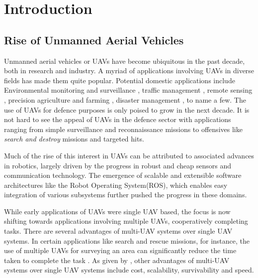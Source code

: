 
\chapter{Introduction} %

\label{Chapter1} %



\section{Rise of Unmanned Aerial Vehicles}
Unmanned aerial vehicles or UAVs have become ubiquitous in the past decade, both in research and industry. A myriad of applications involving UAVs in diverse fields has made them quite popular. Potential domestic  applications include Environmental monitoring and surveillance \cite{envmon}, traffic management \cite{trasur}, remote sensing \cite{remsen}, precision agriculture and farming \cite{preagr}, disaster management \cite{disman}, to name a few. The use of UAVs for defence purposes is only poised to grow in the next decade. It is not hard to see the appeal of UAVs in the defence sector with applications ranging from simple surveillance and reconnaissance missions to offensives like \textit{search and destroy} missions and targeted hits.

Much of the rise of this interest in UAVs can be attributed to associated advances in robotics, largely driven by the progress in robust and cheap sensors and communication technology. The emergence of scalable and extensible software architectures like the Robot Operating System(ROS), which enables easy integration of various subsystems further pushed the progress in these domains.

While early applications of UAVs were single UAV based, the focus is now shifting towards applications involving multiple UAVs, cooperatively completing tasks. There are several advantages of multi-UAV systems over single UAV systems. In certain applications like search and rescue missions, for instance, the use of multiple UAVs for surveying an area can significantly reduce the time taken to complete the task \cite{coosea}. As given by \cite{fanets}, other advantages of multi-UAV systems over single UAV systems include cost, scalability, survivability and speed.

